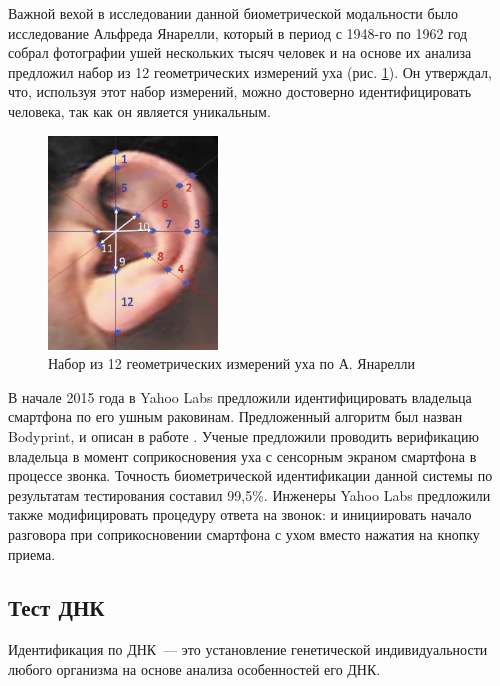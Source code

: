 \documentclass[14pt, a4paper]{extarticle}
\begin{document}

Важной вехой в исследовании данной биометрической модальности было исследование Альфреда Янарелли, который в период с 1948-го по 1962 год собрал фотографии ушей нескольких тысяч человек и на основе их анализа предложил набор из 12 геометрических измерений уха (рис. \ref{img:ear}). Он утверждал, что, используя этот набор измерений, можно достоверно идентифицировать человека, так как он является уникальным.

\begin{center}
	\begin{figure}[h!]
		\centering
		\includegraphics[width=0.4\textwidth]{ear.png}
		\caption{Набор из 12 геометрических измерений уха по А. Янарелли}
		\label{img:ear}
	\end{figure}
\end{center}
\vspace{-1cm}

В начале 2015 года в Yahoo Labs предложили идентифицировать владельца смартфона по его ушным раковинам. Предложенный алгоритм был назван Bodyprint, и описан в работе \cite{holz2015bodyprint}. Ученые предложили проводить верификацию владельца в момент соприкосновения уха с сенсорным экраном смартфона в процессе звонка. Точность биометрической идентификации данной системы по результатам тестирования составил 99,5\%. Инженеры Yahoo Labs предложили также модифицировать процедуру ответа на звонок: и инициировать начало разговора при соприкосновении смартфона с ухом вместо нажатия на кнопку приема.

\subsection{Тест ДНК}
Идентификация по ДНК~--- это установление генетической индивидуальности любого организма на основе анализа особенностей его ДНК. 
\end{document}
